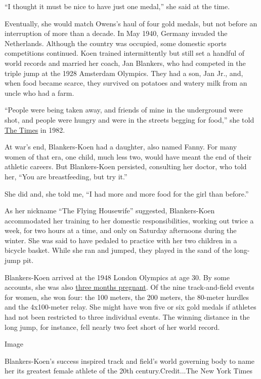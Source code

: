 ``I thought it must be nice to have just one medal,'' she said at the
time.

Eventually, she would match Owens's haul of four gold medals, but not
before an interruption of more than a decade. In May 1940, Germany
invaded the Netherlands. Although the country was occupied, some
domestic sports competitions continued. Koen trained intermittently but
still set a handful of world records and married her coach, Jan
Blankers, who had competed in the triple jump at the 1928 Amsterdam
Olympics. They had a son, Jan Jr., and, when food became scarce, they
survived on potatoes and watery milk from an uncle who had a farm.

``People were being taken away, and friends of mine in the underground
were shot, and people were hungry and were in the streets begging for
food,'' she told
\href{https://www.nytimes3xbfgragh.onion/1982/10/02/sports/players-olympian-ahead-of-her-time.html}{The
Times} in 1982.

At war's end, Blankers-Koen had a daughter, also named Fanny. For many
women of that era, one child, much less two, would have meant the end of
their athletic careers. But Blankers-Koen persisted, consulting her
doctor, who told her, ``You are breastfeeding, but try it.''

She did and, she told me, ``I had more and more food for the girl than
before.''

As her nickname ``The Flying Housewife'' suggested, Blankers-Koen
accommodated her training to her domestic responsibilities, working out
twice a week, for two hours at a time, and only on Saturday afternoons
during the winter. She was said to have pedaled to practice with her two
children in a bicycle basket. While she ran and jumped, they played in
the sand of the long-jump pit.

Blankers-Koen arrived at the 1948 London Olympics at age 30. By some
accounts, she was also
\href{https://theolympians.co/tag/fanny-blankers-koen/}{three months
pregnant}. Of the nine track-and-field events for women, she won four:
the 100 meters, the 200 meters, the 80-meter hurdles and the 4x100-meter
relay. She might have won five or six gold medals if athletes had not
been restricted to three individual events. The winning distance in the
long jump, for instance, fell nearly two feet short of her world record.

Image

Blankers-Koen's success inspired track and field's world governing body
to name her its greatest female athlete of the 20th century.Credit...The
New York Times

